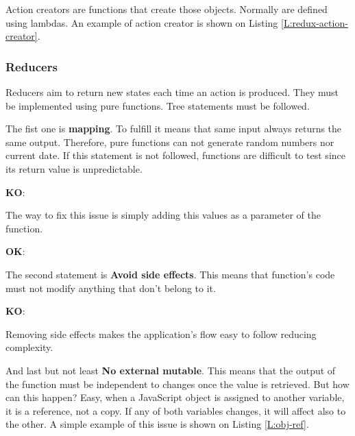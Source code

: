 Action creators are functions that create those objects. Normally are defined
using lambdas. An example of action creator is shown on Listing
\ref{L:redux-action-creator}.

\begin{codefigure}
\end{codefigure}

\subsubsection{Reducers}

Reducers aim to return new states each time an action is produced. They must be
implemented using pure functions. Tree statements must be followed.

The fist one is \textbf{mapping}. To fulfill it means that same input always 
returns the same output. Therefore, pure functions can not generate random
numbers nor current date. If this statement is not followed, functions are
difficult to test since its return value is unpredictable.

\begin{center}
	\textbf{KO}: 
\end{center}

The way to fix this issue is simply adding this values as a parameter of the 
function.

\begin{center}
	\textbf{OK}: 
\end{center}

The second statement is \textbf{Avoid side effects}. This means that function's
code must not modify anything that don't belong to it.

\begin{center}
	\textbf{KO}: 
\end{center}

Removing side effects makes the application's flow easy to follow reducing
complexity.

And last but not least \textbf{No external mutable}. This means that the output
of the function must be independent to changes once the value is retrieved. But
how can this happen? Easy, when a JavaScript object is assigned to another
variable, it is a reference, not a copy. If any of both variables changes, it
will affect also to the other. A simple example of this issue is shown on 
Listing \ref{L:obj-ref}.

